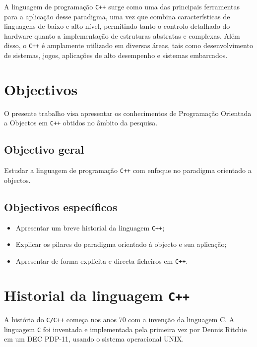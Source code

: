 \documentclass[a4paper,12pt]{article}
\begin{document}
A linguagem de programação \texttt{C++} surge como uma das principais ferramentas para a aplicação 
desse paradigma, uma vez que combina características de linguagens de baixo e alto nível, permitindo 
tanto o controlo detalhado do hardware quanto a implementação de estruturas abstratas e complexas. Além disso, 
o \texttt{C++} é amplamente utilizado em diversas áreas, tais como desenvolvimento de sistemas, jogos, aplicações 
de alto desempenho e sistemas embarcados. 


\newpage
\section{Objectivos}
O presente trabalho visa apresentar os conhecimentos de Programação Orientada a Objectos em 
 \texttt{C++} obtidos no âmbito da pesquisa.                                                                                                                                                                                                                                                                                                                                                                                         
\subsection{Objectivo geral}
Estudar a linguagem de programação \texttt{C++} com enfoque no paradigma 
orientado a objectos.
\subsection{Objectivos específicos}
\begin{itemize}
\item Apresentar um breve historial da linguagem \texttt{C++};
\item Explicar os pilares do paradigma orientado à objecto e sua aplicação;
\item Apresentar de forma explícita e directa ficheiros em \texttt{C++}.

\end{itemize}


\newpage

\section{Historial da linguagem \texttt{C++}}

A história do \texttt{C/C++} começa nos anos 70 com a invenção da linguagem C. 
A linguagem \texttt{C} foi inventada e implementada pela primeira vez por Dennis Ritchie 
em um DEC PDP-11, usando o sistema operacional UNIX.
\end{document}
